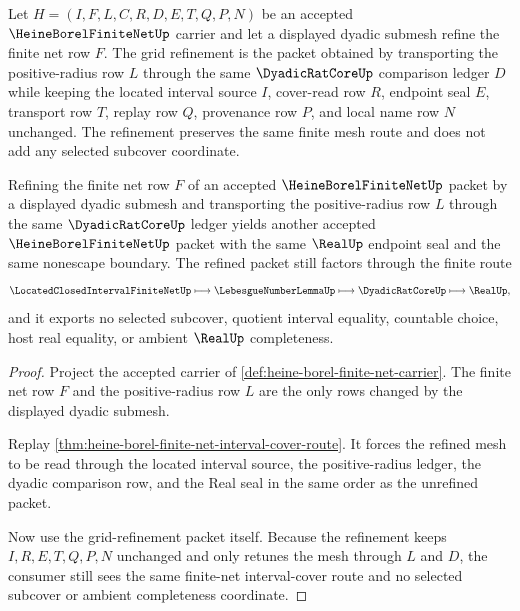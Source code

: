 \begin{definition}
\label{def:heine-borel-finite-net-grid-refinement}
Let $H=(I,F,L,C,R,D,E,T,Q,P,N)$ be an accepted $\HeineBorelFiniteNetUp$ carrier and let a displayed dyadic submesh refine the finite net row $F$. The grid refinement is the packet obtained by transporting the positive-radius row $L$ through the same $\DyadicRatCoreUp$ comparison ledger $D$ while keeping the located interval source $I$, cover-read row $R$, endpoint seal $E$, transport row $T$, replay row $Q$, provenance row $P$, and local name row $N$ unchanged. The refinement preserves the same finite mesh route and does not add any selected subcover coordinate.
\end{definition}

\begin{theorem}
\label{thm:heine-borel-finite-net-grid-refinement}
Refining the finite net row $F$ of an accepted $\HeineBorelFiniteNetUp$ packet by a displayed dyadic submesh and transporting the positive-radius row $L$ through the same $\DyadicRatCoreUp$ ledger yields another accepted $\HeineBorelFiniteNetUp$ packet with the same $\RealUp$ endpoint seal and the same nonescape boundary. The refined packet still factors through the finite route
$$
\LocatedClosedIntervalFiniteNetUp \longmapsto \LebesgueNumberLemmaUp \longmapsto \DyadicRatCoreUp \longmapsto \RealUp ,
$$
and it exports no selected subcover, quotient interval equality, countable choice, host real equality, or ambient $\RealUp$ completeness.
\end{theorem}
\begin{proof}
Project the accepted carrier of \autoref{def:heine-borel-finite-net-carrier}. The finite net row $F$ and the positive-radius row $L$ are the only rows changed by the displayed dyadic submesh.

Replay \autoref{thm:heine-borel-finite-net-interval-cover-route}. It forces the refined mesh to be read through the located interval source, the positive-radius ledger, the dyadic comparison row, and the Real seal in the same order as the unrefined packet.

Now use the grid-refinement packet itself. Because the refinement keeps $I,R,E,T,Q,P,N$ unchanged and only retunes the mesh through $L$ and $D$, the consumer still sees the same finite-net interval-cover route and no selected subcover or ambient completeness coordinate.
\end{proof}

